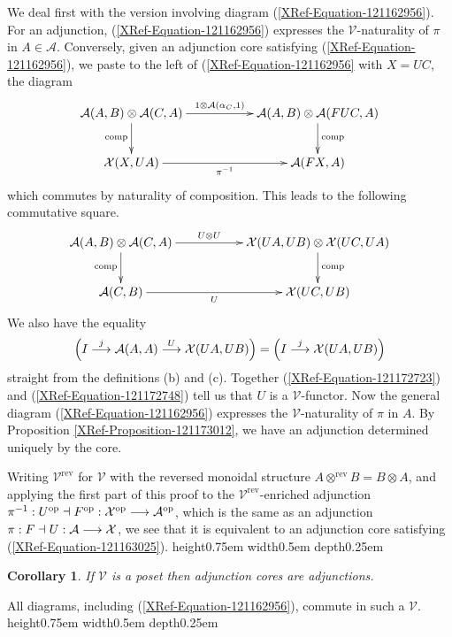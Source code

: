 \documentclass[a4paper,10pt]{article}
\newcommand{\qed}{\nobreak \ifvmode \relax \else
      \ifdim\lastskip<1.5em \hskip-\lastskip
      \hskip1.5em plus0em minus0.5em \fi \nobreak
      \vrule height0.75em width0.5em depth0.25em\fi}
\newtheorem{corollary}[theorem]{Corollary}
\newenvironment{proof}[1][Proof]{\begin{trivlist}
\item[\hskip \labelsep {\bfseries #1}]}{\end{trivlist}}
\newcommand{\ba}{{\cal{A}}}
\newcommand{\bx}{{\cal{X}}}
\newcommand{\ev}{\mathcal{V} }
\numberwithin{equation}{section}
\begin{document}
\begin{proof} 
We deal first with the version involving diagram
(\ref{XRef-Equation-121162956}). For an adjunction, (\ref{XRef-Equation-121162956})
expresses the $\ev$-naturality of $\pi $ in $A\in \mathcal{A}$.
Conversely, given an adjunction core satisfying (\ref{XRef-Equation-121162956}),
we paste to the left of (\ref{XRef-Equation-121162956} with $X =UC$, the diagram 
\begin{equation}
\xymatrix{
\ba (A,B) \otimes \ba (C,A) \ar[rr]^-{1 \otimes \ba (\alpha _C ,1) } \ar[d]_-{\mathrm{comp}} && \ba (A,B) \otimes \ba (FUC,A) \ar[d]^-{\mathrm{comp}} \\
\bx (X,UA)  \ar[rr]_-{\pi^{-1} } && \ba (FX,A) }
\end{equation}
which commutes by naturality of composition. This leads to the following commutative square.
\begin{equation}\label{XRef-Equation-121172723}
\xymatrix{
\ba (A,B) \otimes \ba (C,A)  \ar[rr]^-{U \otimes U} \ar[d]_-{\mathrm{comp}} && \bx (UA,UB) \otimes \bx (UC,UA)  \ar[d]^-{\mathrm{comp}} \\
\ba (C,B)  \ar[rr]_-{U} && \bx (UC,UB) }
\end{equation}
We also have the equality
\begin{equation}
\left( I\overset{j}{\longrightarrow }\mathcal{A}( A,A) \overset{U}{\longrightarrow
}\bx( U A,U B) \right) =\left( I\overset{j}{\longrightarrow
}\bx( U A,U B) \right) %
\label{XRef-Equation-121172748}
\end{equation}
straight from the definitions (b) and (c). Together (\ref{XRef-Equation-121172723})
and (\ref{XRef-Equation-121172748}) tell us that $U$ is a $\ev$-functor.
Now the general diagram (\ref{XRef-Equation-121162956}) expresses
the $\ev$-naturality of $\pi $ in $A$. By Proposition \ref{XRef-Proposition-121173012},
we have an adjunction determined uniquely by the core.

Writing $\ev^{\mathrm{rev}}$ for $\ev$ with the
reversed monoidal structure $A\otimes ^{\mathrm{rev}}B=B\otimes
A$, and applying the first part of this proof to the $\ev^{\mathrm{rev}}$-enriched
adjunction $\pi ^{-1}:U^{\mathrm{op}}\dashv F^{\mathrm{op}}:\bx^{\mathrm{op}}\longrightarrow
\mathcal{A}^{\mathrm{op}}$, which is the same as an adjunction $\pi
:F\dashv U:\mathcal{A}\longrightarrow \bx$, we see that
it is equivalent to an adjunction core satisfying (\ref{XRef-Equation-121163025}). \qed
\end{proof}

\begin{corollary}
If $\ev$ is a poset then adjunction cores are adjunctions.
\end{corollary}
\begin{proof}
All diagrams, including (\ref{XRef-Equation-121162956}),
commute in such a $\ev$. \qed
\end{proof}
\end{document}
